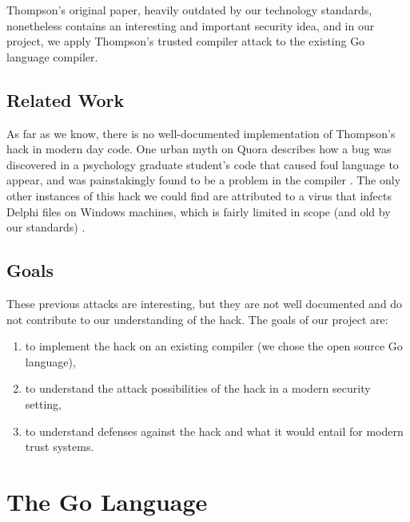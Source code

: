 \documentclass[10pt]{sigplanconf}
\begin{document}
Thompson's original paper, heavily outdated by our technology standards, nonetheless contains an interesting and important security idea, and in our project, we apply Thompson's trusted compiler attack to the existing Go language compiler.

\subsection{Related Work}
As far as we know, there is no well-documented implementation of Thompson's hack in modern day code. One urban myth on Quora describes how a bug was discovered in a psychology graduate student's code that caused foul language to appear, and was painstakingly found to be a problem in the compiler \cite{quora}. The only other instances of this hack we could find are attributed to a virus that infects Delphi files on Windows machines, which is fairly limited in scope (and old by our standards) \cite{sophos} \cite{symantec}.

\subsection{Goals}
These previous attacks are interesting, but they are not well documented and do not contribute to our understanding of the hack. The goals of our project are:
\begin{enumerate}
\item to implement the hack on an existing compiler (we chose the open source Go language),
\item to understand the attack possibilities of the hack in a modern security setting,
\item to understand defenses against the hack and what it would entail for modern trust systems.
\end{enumerate}

\section{The Go Language}
\end{document}
